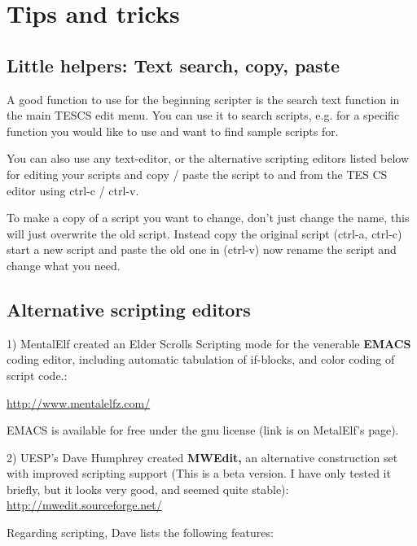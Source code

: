 \hypertarget{tips-and-tricks}{%
\section{\texorpdfstring{\hfill\break
Tips and tricks}{ Tips and tricks}}\label{tips-and-tricks}}

\hypertarget{little-helpers-text-search-copy-paste}{%
\subsection{Little helpers: Text search, copy,
paste}\label{little-helpers-text-search-copy-paste}}

A good function to use for the beginning scripter is the search text
function in the main TESCS edit menu. You can use it to search scripts,
e.g. for a specific function you would like to use and want to find
sample scripts for.

You can also use any text-editor, or the alternative scripting editors
listed below for editing your scripts and copy / paste the script to and
from the TES CS editor using ctrl-c / ctrl-v.

To make a copy of a script you want to change, don't just change the
name, this will just overwrite the old script. Instead copy the original
script (ctrl-a, ctrl-c) start a new script and paste the old one in
(ctrl-v) now rename the script and change what you need.

\hypertarget{alternative-scripting-editors}{%
\subsection{Alternative scripting
editors}\label{alternative-scripting-editors}}

1) MentalElf created an Elder Scrolls Scripting mode for the venerable
\textbf{EMACS} coding editor, including automatic tabulation of
if-blocks, and color coding of script code.:

\url{http://www.mentalelfz.com/}

EMACS is available for free under the gnu license (link is on MetalElf's
page).

2) UESP's Dave Humphrey created \textbf{MWEdit,} an alternative
construction set with improved scripting support (This is a beta
version. I have only tested it briefly, but it looks very good, and
seemed quite stable): \url{http://mwedit.sourceforge.net/}

Regarding scripting, Dave lists the following features:

